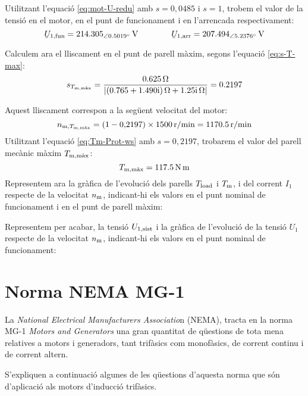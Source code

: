 \begin{exemple}
	Utilitzant l'equació \eqref{eq:mot-U-redu} amb $s=0{,}0485$ i $s=1$, trobem el valor de la tensió en el motor, en el punt de funcionament i en l'arrencada respectivament:
	\[
		\cmplx{U}\ped{1,fun} = \qtypd{214,305}{0,5019}{V} \qquad \qquad
		\cmplx{U}\ped{1,arr} = \qtypd{207,494}{5,2376}{V}
	\]
	
	Calculem ara el lliscament en el punt de parell màxim, segons l'equació \eqref{eq:s-T-max}:
	\[
		s_{T\ped{m,\text{màx}}} =  \frac{\qty{0,625}{\ohm}}{|\complexqty{0,765+j1,490}{\ohm} + \complexqty{j1,25}{\ohm}|} = \num{0,2197} 
	\]
	
	Aquest lliscament correspon a la següent  velocitat del motor:
	\[
		n_{\text{m},T_\mathrm{m,\text{màx}}} = (1 - 0{,}2197) \times \qty{1500}{r/min} = \qty{1170,5}{r/min}
	\]
	Utilitzant l'equació  \eqref{eq:Tm-Prot-ws} amb
	 $s=0{,}2197$, trobarem el valor del parell mecànic màxim  $T_\mathrm{m,\text{màx}}$:
	\[
		T_\mathrm{m,\text{màx}} = \qty{117,5}{N.m}
	\]	
	Representem ara la gràfica de l'evolució dels parells $T_\mathrm{load}$ i   $T_\mathrm{m}$, i del	corrent $I_1$ respecte de la velocitat $n_\mathrm{m}$, indicant-hi els valors en el punt nominal de funcionament i en el punt de parell màxim:
	\begin{center}
		\fontsize{10pt}{11pt}\selectfont
		
	\end{center}
	Representem per acabar, la tensió $U_\mathrm{1,sist}$ i la gràfica de l'evolució de la tensió $U_1$ respecte de la velocitat $n_\mathrm{m}$, indicant-hi els valors en el punt nominal de funcionament:
	\begin{center}
		\fontsize{10pt}{11pt}\selectfont
		
	\end{center}

\end{exemple}	

	    
\section{Norma NEMA MG-1}

La \textit{National Electrical Manufacturers Associatio}n (NEMA),
tracta en la norma  MG-1 \textit{Motors and Generators} una gran quantitat de qüestions de tota mena relatives a motors i generadors, tant trifàsics com monofàsics, de corrent continu i de corrent altern.

S'expliquen a continuació algunes de les qüestions d'aquesta norma que són d'aplicació als motors d'inducció trifàsics.

